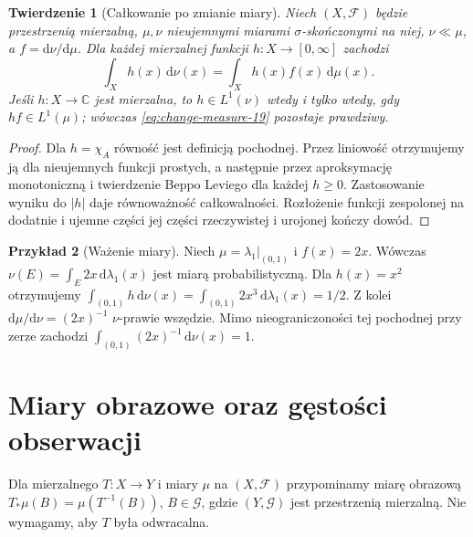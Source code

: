 \documentclass[11pt,a4paper,oneside]{book}
\numberwithin{equation}{chapter}
\theoremstyle{plain}
\newtheorem{twierdzenie}{Twierdzenie}[chapter]
\theoremstyle{definition}
\newtheorem{przyklad}[twierdzenie]{Przykład}
\theoremstyle{remark}
\begin{document}
\begin{twierdzenie}[Całkowanie po zmianie miary]
\label{thm:change-measure-19}
Niech $(X,\mathcal F)$ będzie przestrzenią mierzalną,
$\mu,\nu$ nieujemnymi miarami $\sigma$-skończonymi na niej,
$\nu\ll\mu$, a $f=\mathrm d\nu/\mathrm d\mu$.
Dla każdej mierzalnej funkcji $h:X\to[0,\infty]$ zachodzi
\begin{equation}\label{eq:change-measure-19}
 \int_X h(x)\,\mathrm d\nu(x)
 =\int_X h(x)f(x)\,\mathrm d\mu(x).
\end{equation}
Jeśli $h:X\to\mathbb C$ jest mierzalna, to $h\in L^1(\nu)$
wtedy i tylko wtedy, gdy $hf\in L^1(\mu)$; wówczas
\eqref{eq:change-measure-19} pozostaje prawdziwy.
\end{twierdzenie}
\begin{proof}
Dla $h=\chi_A$ równość jest definicją pochodnej.
Przez liniowość otrzymujemy ją dla nieujemnych funkcji prostych,
a następnie przez aproksymację monotoniczną i twierdzenie Beppo
Leviego dla każdej $h\ge0$. Zastosowanie wyniku do $|h|$
daje równoważność całkowalności. Rozłożenie funkcji zespolonej
na dodatnie i ujemne części jej części rzeczywistej i urojonej
kończy dowód.
\end{proof}

\begin{przyklad}[Ważenie miary]
Niech $\mu=\lambda_1|_{(0,1)}$ i $f(x)=2x$.
Wówczas $\nu(E)=\int_E 2x\,\mathrm d\lambda_1(x)$ jest
miarą probabilistyczną. Dla $h(x)=x^2$ otrzymujemy
$\int_{(0,1)}h\,\mathrm d\nu(x)
=\int_{(0,1)}2x^3\,\mathrm d\lambda_1(x)=1/2$.
Z kolei $\mathrm d\mu/\mathrm d\nu=(2x)^{-1}$
$\nu$-prawie wszędzie. Mimo nieograniczoności tej pochodnej
przy zerze zachodzi
$\int_{(0,1)}(2x)^{-1}\,\mathrm d\nu(x)=1$.
\end{przyklad}

\section{Miary obrazowe oraz gęstości obserwacji}
Dla mierzalnego $T:X\to Y$ i miary $\mu$ na $(X,\mathcal F)$
przypominamy miarę obrazową
$T_*\mu(B)=\mu(T^{-1}(B))$, $B\in\mathcal G$,
gdzie $(Y,\mathcal G)$ jest przestrzenią mierzalną.
Nie wymagamy, aby $T$ była odwracalna.
\end{document}
